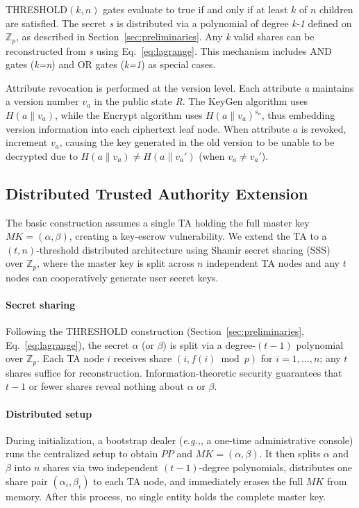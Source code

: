 \documentclass[lettersize,journal]{IEEEtran}
\newcommand{\eg}{\textit{e.g.,}}
\begin{document}
THRESHOLD$(k,n)$ gates evaluate to true if and only if at least $k$ of
$n$ children are satisfied. The secret \textit{s} is distributed via a
polynomial of degree \textit{k-1} defined on $\mathbb{Z}_p$, as described
in Section~\ref{sec:preliminaries}. Any \textit{k} valid shares can be
reconstructed from \textit{s} using Eq.~\eqref{eq:lagrange}. This
mechanism includes AND gates (\textit{k=n}) and OR gates (\textit{k=1})
as special cases.

Attribute revocation is performed at the version level. Each attribute
\textit{a} maintains a version number $v_a$ in the public state
\textit{R}. The KeyGen algorithm uses $H(a \| v_a)$, while the Encrypt
algorithm uses $H(a \| v_a)^{s_a}$, thus embedding version information
into each ciphertext leaf node. When attribute $a$ is revoked,
increment $v_a$, causing the key generated in the old version to be
unable to be decrypted due to $H(a \| v_a) \neq H(a \| v_a')$ (when
$v_a \neq v_a'$).

\subsection{Distributed Trusted Authority Extension}
\label{subsec:distributed_ta}

The basic construction assumes a single TA holding the full master key
$MK=(\alpha,\beta)$, creating a key-escrow vulnerability. We extend the
TA to a $(t,n)$-threshold distributed architecture using Shamir secret
sharing (SSS)~\cite{Shamir1979} over $\mathbb{Z}_p$, where the master
key is split across $n$ independent TA nodes and any $t$ nodes can
cooperatively generate user secret keys.

\paragraph{Secret sharing}
Following the THRESHOLD construction (Section~\ref{sec:preliminaries}, Eq.~\eqref{eq:lagrange}), the secret $\alpha$ (or $\beta$) is split via a degree-$(t-1)$ polynomial over $\mathbb{Z}_p$. Each TA node $i$ receives share $(i, f(i) \bmod p)$ for $i=1,\dots,n$; any $t$ shares suffice for reconstruction. Information-theoretic security guarantees that $t-1$ or fewer shares reveal nothing about $\alpha$ or $\beta$.

\paragraph{Distributed setup}
During initialization, a bootstrap dealer (\eg, a one-time administrative
console) runs the centralized setup to obtain $PP$ and $MK=(\alpha,\beta)$.
It then splits $\alpha$ and $\beta$ into $n$ shares via two
independent $(t-1)$-degree polynomials, distributes one share pair
$(\alpha_i, \beta_i)$ to each TA node, and immediately erases the full
$MK$ from memory. After this process, no single entity holds the
complete master key.
\end{document}
